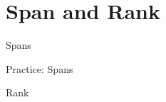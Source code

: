\section{Span and Rank}

\begin{frame}{Spans}

\end{frame}

\begin{frame}{Practice: Spans}

\end{frame}

\begin{frame}{Rank}

\end{frame}

